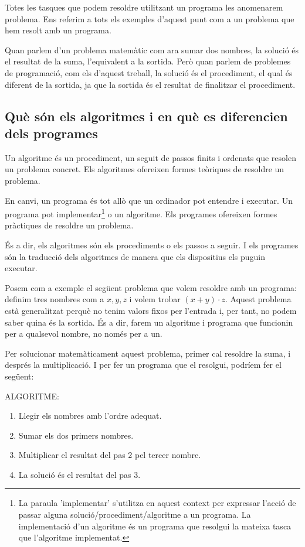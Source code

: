 Totes les tasques que podem resoldre utilitzant un programa les anomenarem problema. Ens referim a tots els exemples d'aquest punt com a un problema que hem resolt amb un programa. 

Quan parlem d'un problema matemàtic com ara sumar dos nombres, la solució és el resultat de la suma, l'equivalent a la sortida. Però quan parlem de problemes de programació, com els d'aquest treball, la solució és el procediment, el qual és diferent de la sortida, ja que la sortida és el resultat de finalitzar el procediment.

\subsection{Què són els algoritmes i en què es diferencien dels programes}
Un algoritme és un procediment, un seguit de passos finits i ordenats que resolen un problema concret. Els algoritmes ofereixen formes teòriques de resoldre un problema.

En canvi, un programa és tot allò que un ordinador pot entendre i executar. Un programa pot implementar\footnote{La paraula 'implementar' s'utilitza en aquest context per expressar l'acció de passar alguna solució/procediment/algoritme a un programa. La implementació d'un algoritme és un programa que resolgui la mateixa tasca que l'algoritme implementat.} o  un algoritme. Els programes ofereixen formes pràctiques de resoldre un problema.

És a dir, els algoritmes són els procediments o els passos a seguir. I els programes són la traducció dels algoritmes de manera que els dispositius els puguin executar.

Posem com a exemple el següent problema que volem resoldre amb un programa: definim tres nombres com a $x, y, z$ i volem trobar $(x+y)\cdot z$. Aquest problema està generalitzat perquè no tenim valors fixos per l'entrada i, per tant, no podem saber quina és la sortida. És a dir, farem un algoritme i programa que funcionin per a qualsevol nombre, no només per a un.

Per solucionar matemàticament aquest problema, primer cal resoldre la suma, i després la multiplicació. I per fer un programa que el resolgui, podríem fer el següent:

ALGORITME:
\begin{enumerate}
    \item Llegir els nombres amb l'ordre adequat.
    \item Sumar els dos primers nombres.
    \item Multiplicar el resultat del pas 2 pel tercer nombre.
    \item La solució és el resultat del pas 3.
\end{enumerate}

